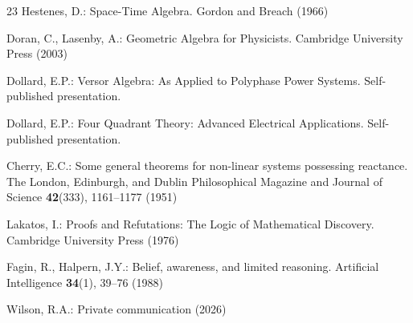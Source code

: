\documentclass[runningheads]{llncs}
\begin{document}
\begin{thebibliography}{23}
Hestenes, D.: Space-Time Algebra. Gordon and Breach (1966)

Doran, C., Lasenby, A.: Geometric Algebra for Physicists.
Cambridge University Press (2003)

Dollard, E.P.: Versor Algebra: As Applied to Polyphase Power Systems.
Self-published presentation.

Dollard, E.P.: Four Quadrant Theory: Advanced Electrical Applications.
Self-published presentation.

Cherry, E.C.: Some general theorems for non-linear systems possessing reactance.
The London, Edinburgh, and Dublin Philosophical Magazine and Journal of Science
\textbf{42}(333), 1161--1177 (1951)

Lakatos, I.: Proofs and Refutations: The Logic of Mathematical Discovery.
Cambridge University Press (1976)

Fagin, R., Halpern, J.Y.: Belief, awareness, and limited reasoning.
Artificial Intelligence \textbf{34}(1), 39--76 (1988)

Wilson, R.A.: Private communication (2026)

\end{thebibliography}
\end{document}
